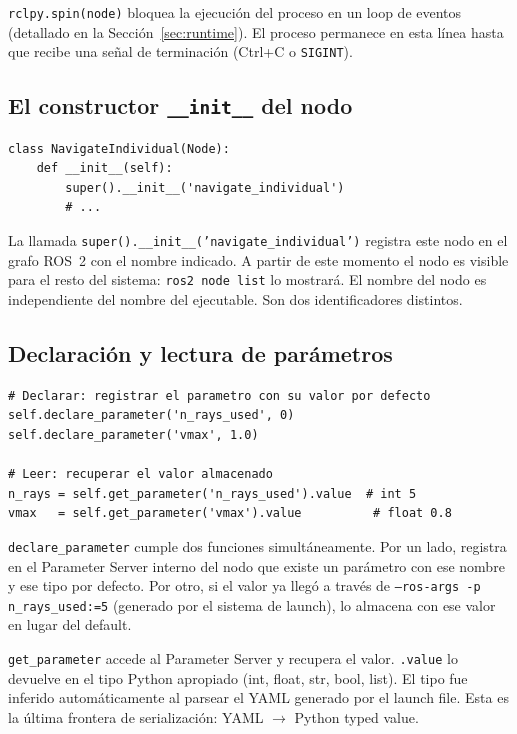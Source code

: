 \texttt{rclpy.spin(node)} bloquea la ejecución del proceso en un loop de eventos (detallado en la Sección~\ref{sec:runtime}). El proceso permanece en esta línea hasta que recibe una señal de terminación (Ctrl+C o \texttt{SIGINT}).

\subsection{El constructor \texttt{\_\_init\_\_} del nodo}

\begin{lstlisting}[style=python, caption={Constructor de un nodo ROS~2.}]
class NavigateIndividual(Node):
    def __init__(self):
        super().__init__('navigate_individual')
        # ...
\end{lstlisting}

La llamada \texttt{super().\_\_init\_\_('navigate\_individual')} registra este nodo en el grafo ROS~2 con el nombre indicado. A partir de este momento el nodo es visible para el resto del sistema: \texttt{ros2 node list} lo mostrará. El nombre del nodo es independiente del nombre del ejecutable. Son dos identificadores distintos.

\subsection{Declaración y lectura de parámetros}

\begin{lstlisting}[style=python, caption={Declaración y lectura de parámetros en el nodo.}]
# Declarar: registrar el parametro con su valor por defecto
self.declare_parameter('n_rays_used', 0)
self.declare_parameter('vmax', 1.0)

# Leer: recuperar el valor almacenado
n_rays = self.get_parameter('n_rays_used').value  # int 5
vmax   = self.get_parameter('vmax').value          # float 0.8
\end{lstlisting}

\texttt{declare\_parameter} cumple dos funciones simultáneamente. Por un lado, registra en el Parameter Server interno del nodo que existe un parámetro con ese nombre y ese tipo por defecto. Por otro, si el valor ya llegó a través de \texttt{--ros-args -p n\_rays\_used:=5} (generado por el sistema de launch), lo almacena con ese valor en lugar del default.

\texttt{get\_parameter} accede al Parameter Server y recupera el valor. \texttt{.value} lo devuelve en el tipo Python apropiado (int, float, str, bool, list). El tipo fue inferido automáticamente al parsear el YAML generado por el launch file. Esta es la última frontera de serialización: YAML $\rightarrow$ Python typed value.

